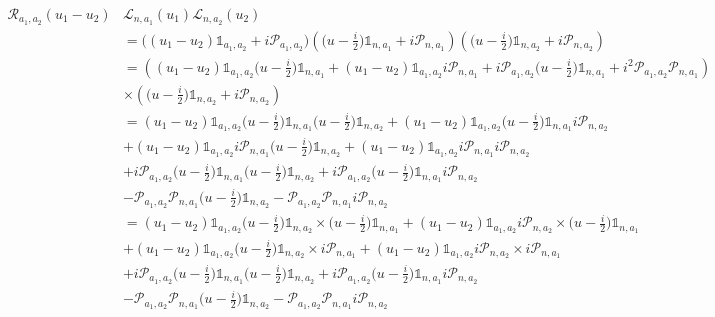 \documentclass{homework}
\begin{document}
\begin{align*}
    \bm{\mathcal{R}}_{a_1, a_2}(u_1-u_2) & \bm{\mathcal{L}}_{n, a_1} (u_1) \bm{\mathcal{L}}_{n, a_2} (u_2) \\ 
    &= {\bigg((u_1-u_2) \mathds{1}_{a_1, a_2} 
    + i \bm{\mathcal{P}}_{a_1, a_2}\bigg)}   \left(\bigg(u-\frac{i}{2}\bigg) \mathds{1}_{n, a_1} + i \bm{\mathcal{P}}_{n, a_1}\right) \left(\bigg(u-\frac{i}{2}\bigg) \mathds{1}_{n, a_2} + i \bm{\mathcal{P}}_{n, a_2}\right) \\
    &= \left({(u_1-u_2) \mathds{1}_{a_1, a_2} \bigg(u-\frac{i}{2}\bigg) \mathds{1}_{n, a_1}} + {(u_1-u_2) \mathds{1}_{a_1, a_2} i \bm{\mathcal{P}}_{n, a_1}} + i \bm{\mathcal{P}}_{a_1, a_2} \bigg(u-\frac{i}{2}\bigg) \mathds{1}_{n, a_1} + i^2 \bm{\mathcal{P}}_{a_1, a_2}  \bm{\mathcal{P}}_{n, a_1} \right) \\
    & \times \left(\bigg(u-\frac{i}{2}\bigg) \mathds{1}_{n, a_2} + i \bm{\mathcal{P}}_{n, a_2}\right) \\
    &= {(u_1-u_2) \mathds{1}_{a_1, a_2} \bigg(u-\frac{i}{2}\bigg) \mathds{1}_{n, a_1}} \bigg(u-\frac{i}{2}\bigg) \mathds{1}_{n, a_2} + {(u_1-u_2) \mathds{1}_{a_1, a_2} \bigg(u-\frac{i}{2}\bigg) \mathds{1}_{n, a_1}} i \bm{\mathcal{P}}_{n, a_2} \\
    &+ {(u_1-u_2) \mathds{1}_{a_1, a_2} i \bm{\mathcal{P}}_{n, a_1}} \bigg(u-\frac{i}{2}\bigg) \mathds{1}_{n, a_2} + {(u_1-u_2) \mathds{1}_{a_1, a_2} i \bm{\mathcal{P}}_{n, a_1}} i \bm{\mathcal{P}}_{n, a_2} \\ 
    &+ i \bm{\mathcal{P}}_{a_1, a_2} \bigg(u-\frac{i}{2}\bigg)\mathds{1}_{n, a_1}  \bigg(u-\frac{i}{2}\bigg) \mathds{1}_{n, a_2} + i \bm{\mathcal{P}}_{a_1, a_2} \bigg(u-\frac{i}{2}\bigg) \mathds{1}_{n, a_1} i \bm{\mathcal{P}}_{n, a_2} \\
    & - \bm{\mathcal{P}}_{a_1, a_2}  \bm{\mathcal{P}}_{n, a_1}  \bigg(u-\frac{i}{2}\bigg) \mathds{1}_{n, a_2} - \bm{\mathcal{P}}_{a_1, a_2}  \bm{\mathcal{P}}_{n, a_1} i \bm{\mathcal{P}}_{n, a_2} \\
    & = {(u_1-u_2) \mathds{1}_{a_1, a_2}  \bigg(u-\frac{i}{2}\bigg) \mathds{1}_{n, a_2}} \times \bigg(u-\frac{i}{2}\bigg) \mathds{1}_{n, a_1} + {(u_1-u_2) \mathds{1}_{a_1, a_2} i \bm{\mathcal{P}}_{n, a_2}} \times \bigg(u-\frac{i}{2}\bigg) \mathds{1}_{n, a_1} \\
    &+ {(u_1-u_2) \mathds{1}_{a_1, a_2} \bigg(u-\frac{i}{2}\bigg) \mathds{1}_{n, a_2}} \times  i \bm{\mathcal{P}}_{n, a_1} + {(u_1-u_2) \mathds{1}_{a_1, a_2} i \bm{\mathcal{P}}_{n, a_2}} \times i \bm{\mathcal{P}}_{n, a_1} \\
    &+ i \bm{\mathcal{P}}_{a_1, a_2} \bigg(u-\frac{i}{2}\bigg) \mathds{1}_{n, a_1}  \bigg(u-\frac{i}{2}\bigg) \mathds{1}_{n, a_2} + i \bm{\mathcal{P}}_{a_1, a_2} \bigg(u-\frac{i}{2}\bigg) \mathds{1}_{n, a_1} i \bm{\mathcal{P}}_{n, a_2} \\
    & - \bm{\mathcal{P}}_{a_1, a_2}  \bm{\mathcal{P}}_{n, a_1}  \bigg(u-\frac{i}{2}\bigg) \mathds{1}_{n, a_2} - \bm{\mathcal{P}}_{a_1, a_2}  \bm{\mathcal{P}}_{n, a_1} i \bm{\mathcal{P}}_{n, a_2}\end{align*}
\end{document}
